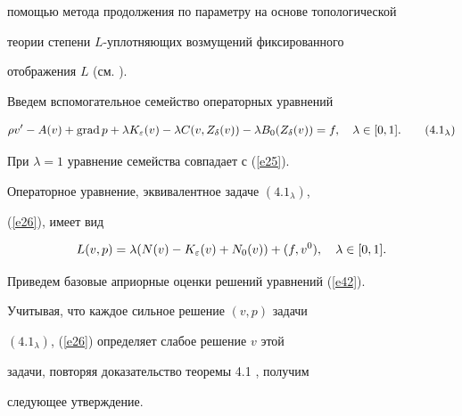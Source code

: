 помощью метода продолжения по параметру на основе топологической


теории степени $L$-уплотняющих возмущений фиксированного


отображения $L$ (см. \cite{ZvDm3}).





Введем вспомогательное семейство операторных уравнений


\begin{equation}


\rho v'-A(v)+\grad p+\lambda K_{\eps}(v)-\lambda C(v, Z_{\delta}(v))


- \lambda B_0(Z_{\delta}(v))=f,\quad \lambda\in [0,1].


\tag{$4.1_\lambda$}


\end{equation}


\addtocounter{equation}{1}





\noindent{}При $\lambda=1$ уравнение семейства совпадает с (\ref{e25}).





Операторное уравнение, эквивалентное задаче $(4.1_{\lambda})$,


(\ref{e26}), имеет вид


\begin{equation}


\label{e42} L(v,p)=\lambda(N(v)-K_{\eps}(v)+


N_0(v))+(f,v^0),\quad \lambda\in [0,1].


\end{equation}





Приведем базовые априорные оценки решений уравнений (\ref{e42}).


Учитывая, что каждое сильное решение $(v,p)$ задачи


$(4.1_{\lambda})$, (\ref{e26}) определяет слабое решение $v$ этой


задачи, повторяя доказательство теоремы 4.1 \cite{ZvDm1}, получим


следующее утверждение.





